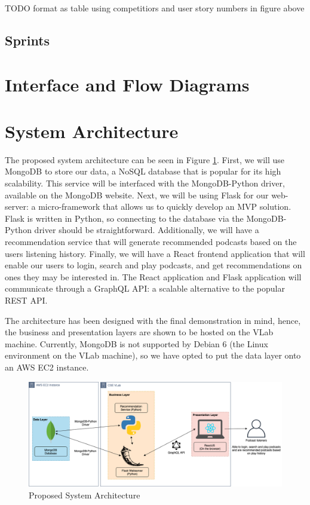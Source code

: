\documentclass[12pt]{article}
\begin{document}
TODO format as table using competitiors and user story numbers in figure above

\subsection{Sprints}

\section{Interface and Flow Diagrams}

\section{System Architecture}

The proposed system architecture can be seen in Figure \ref{fig:SysArch}.
First, we will use MongoDB to store our data, a NoSQL database that is popular for its high scalability.
This service will be interfaced with the MongoDB-Python driver, available on the MongoDB website.
Next, we will be using Flask for our web-server: a micro-framework that allows us to quickly develop an MVP solution.
Flask is written in Python, so connecting to the database via the MongoDB-Python driver should be straightforward.
Additionally, we will have a recommendation service that will generate recommended podcasts based on the users listening history.
Finally, we will have a React frontend application that will enable our users to login, search and play podcasts, and get recommendations on ones they may be interested in.
The React application and Flask application will communicate through a GraphQL API: a scalable alternative to the popular REST API.

The architecture has been designed with the final demonstration in mind, hence, the business and presentation layers are shown to be hosted on the VLab machine.
Currently, MongoDB is not supported by Debian 6 (the Linux environment on the VLab machine), so we have opted to put the data layer onto an AWS EC2 instance.

\begin{figure}[h]
    \includegraphics[width=\textwidth]{resources/SystemArchitecture}
    \caption{Proposed System Architecture}
    \label{fig:SysArch}
\end{figure}



\end{document}
